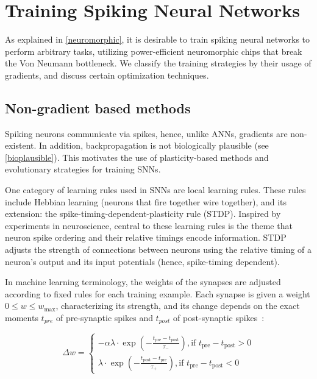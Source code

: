 \documentclass[fyp]{socreport}
\begin{document}
\section{Training Spiking Neural Networks\label{sec:train-spik-neur}}

As explained in \autoref{neuromorphic}, it is desirable to train spiking neural
networks to perform arbitrary tasks, utilizing power-efficient neuromorphic
chips that break the Von Neumann bottleneck. We classify the training strategies
by their usage of gradients, and discuss certain optimization techniques.

\subsection{Non-gradient based methods}

Spiking neurons communicate via spikes, hence, unlike ANNs, gradients are
non-existent. In addition, backpropagation is not biologically plausible (see
\autoref{bioplausible}). This motivates the use of plasticity-based methods and
evolutionary strategies for training SNNs.

One category of learning rules used in SNNs are local learning rules.  These
rules include Hebbian learning (neurons that fire together wire together), and
its extension: the spike-timing-dependent-plasticity rule (STDP). Inspired by
experiments in neuroscience, central to these learning rules is the theme that
neuron spike ordering and their relative timings encode information. STDP
adjusts the strength of connections between neurons using the relative timing of
a neuron's output and its input potentials (hence, spike-timing dependent).

In machine learning terminology, the weights of the synapses are adjusted
according to fixed rules for each training example. Each synapse is given a
weight \(0 \le w \le w_{\max}\), characterizing its strength, and its change
depends on the exact moments \(t_{pre}\) of pre-synaptic spikes and \(t_{post}\)
of post-synaptic spikes~\cite{sboev18_spikin_neural_networ_reinf_learn}:

\begin{equation} \Delta w=\left\{\begin{array}{l}{-\alpha \lambda \cdot \exp \left(-\frac{t_{\mathrm{pre}}-t_{\mathrm{post}}}{\tau_{-}}\right), \text {if } t_{\mathrm{pre}}-t_{\mathrm{post}}>0} \\ {\lambda \cdot \exp \left(-\frac{t_{\mathrm{post}}-t_{\mathrm{pre}}}{\tau_{+}}\right), \text {if } t_{\mathrm{pre}}-t_{\mathrm{post}}<0}\end{array}\right.
\end{equation}
\end{document}
